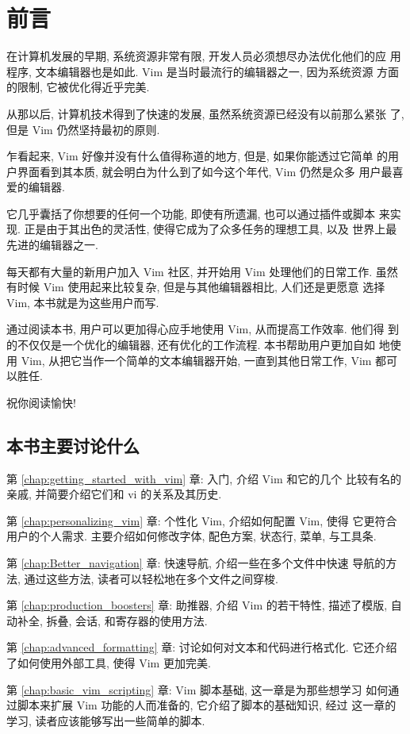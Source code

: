 \chapter{前言}
\label{chap:preface}
在计算机发展的早期, 系统资源非常有限, 开发人员必须想尽办法优化他们的应
用程序, 文本编辑器也是如此. Vim 是当时最流行的编辑器之一, 因为系统资源
方面的限制, 它被优化得近乎完美.

从那以后, 计算机技术得到了快速的发展, 虽然系统资源已经没有以前那么紧张
了, 但是 Vim 仍然坚持最初的原则.

乍看起来, Vim 好像并没有什么值得称道的地方, 但是, 如果你能透过它简单
的用户界面看到其本质, 就会明白为什么到了如今这个年代, Vim 仍然是众多
用户最喜爱的编辑器.

它几乎囊括了你想要的任何一个功能, 即使有所遗漏, 也可以通过插件或脚本
来实现. 正是由于其出色的灵活性, 使得它成为了众多任务的理想工具, 以及
世界上最先进的编辑器之一.

每天都有大量的新用户加入 Vim 社区, 并开始用 Vim 处理他们的日常工作.
虽然有时候 Vim 使用起来比较复杂, 但是与其他编辑器相比, 人们还是更愿意
选择 Vim, 本书就是为这些用户而写.

通过阅读本书, 用户可以更加得心应手地使用 Vim, 从而提高工作效率. 他们得
到的不仅仅是一个优化的编辑器, 还有优化的工作流程. 本书帮助用户更加自如
地使用 Vim, 从把它当作一个简单的文本编辑器开始, 一直到其他日常工作, Vim 
都可以胜任.

祝你阅读愉快!

\section*{本书主要讨论什么}
第 \ref{chap:getting_started_with_vim} 章: 入门, 介绍 Vim 和它的几个
比较有名的亲戚, 并简要介绍它们和 vi 的关系及其历史.

第 \ref{chap:personalizing_vim} 章: 个性化 Vim, 介绍如何配置 Vim, 使得 
它更符合用户的个人需求. 主要介绍如何修改字体, 配色方案, 状态行, 菜单,
与工具条.

第 \ref{chap:Better_navigation} 章: 快速导航, 介绍一些在多个文件中快速
导航的方法, 通过这些方法, 读者可以轻松地在多个文件之间穿梭.

第 \ref{chap:production_boosters} 章: 助推器, 介绍 Vim 的若干特性, 
描述了模版, 自动补全, 拆叠, 会话, 和寄存器的使用方法.

第 \ref{chap:advanced_formatting} 章: 讨论如何对文本和代码进行格式化.
它还介绍了如何使用外部工具, 使得 Vim 更加完美.

第 \ref{chap:basic_vim_scripting} 章: Vim 脚本基础, 这一章是为那些想学习
如何通过脚本来扩展 Vim 功能的人而准备的, 它介绍了脚本的基础知识, 经过
这一章的学习, 读者应该能够写出一些简单的脚本.

